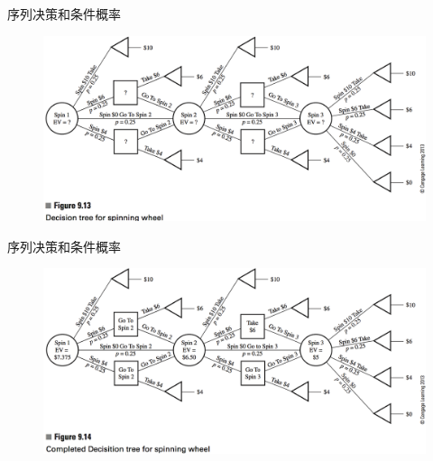 \documentclass[mathserif, table]{beamer}
\begin{document}
\begin{frame}{序列决策和条件概率}
  
  \begin{figure}
    \includegraphics[width=\textwidth{}]{9_13.png}
  \end{figure}

\end{frame}

\begin{frame}{序列决策和条件概率}
  
  \begin{figure}
    \includegraphics[width=\textwidth{}]{9_14.png}
  \end{figure}

\end{frame}
\end{document}
